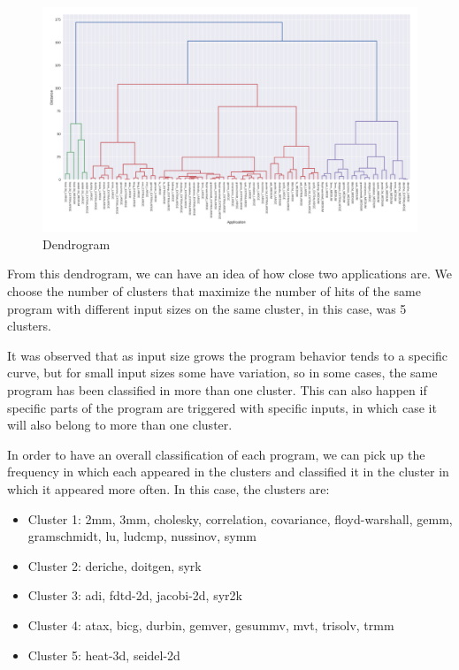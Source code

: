 
\begin{figure}[h]
    \centering
    \includegraphics[width=\textwidth]{fingerprint/figures/dendograma_input_size.png}
    \caption{Dendrogram}
    \label{fig:dendograma_input_size}
\end{figure}

From this dendrogram, we can have an idea of how close two applications are. We choose the number of clusters that maximize the number of hits of the same program with different input sizes on the same cluster, in this case, was 5 clusters.

It was observed that as input size grows the program behavior tends to a specific curve, but for small input sizes some have variation, so in some cases, the same program has been classified in more than one cluster. This can also happen if specific parts of the program are triggered with specific inputs, in which case it will also belong to more than one cluster.

In order to have an overall classification of each program, we can pick up the frequency in which each appeared in the clusters and classified it in the cluster in which it appeared more often. In this case, the clusters are:

\begin{itemize}
    \item Cluster 1: 2mm, 3mm, cholesky, correlation, covariance, floyd-warshall, gemm, gramschmidt, lu, ludcmp, nussinov, symm
    
    \item Cluster 2: deriche, doitgen, syrk
    
    \item Cluster 3: adi, fdtd-2d, jacobi-2d, syr2k
    
    \item Cluster 4: atax, bicg, durbin, gemver, gesummv, mvt, trisolv, trmm
    
    \item Cluster 5: heat-3d, seidel-2d
\end{itemize}

